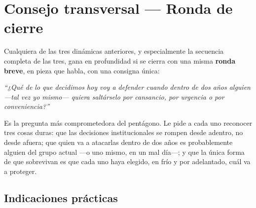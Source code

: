 \documentclass[11pt, a4paper]{article}
\begin{document}
\newpage

\section*{Consejo transversal --- Ronda de cierre}

Cualquiera de las tres dinámicas anteriores, y especialmente la secuencia completa de las tres, gana en profundidad si se cierra con una misma \textbf{ronda breve}, en pieza que habla, con una consigna única:

\vspace{0.5em}

\begin{center}
\begin{tcolorbox}[
  enhanced, colback=organizacionVerde, colframe=organizacionVerde,
  boxrule=0pt, arc=3pt,
  left=18pt, right=18pt, top=16pt, bottom=16pt,
  width=0.88\linewidth,
  halign=center
]
  {\color{parch}\itshape\large ``¿Qué de lo que decidimos hoy voy a defender cuando dentro de dos años alguien ---tal vez yo mismo--- quiera saltárselo por cansancio, por urgencia o por conveniencia?''}
\end{tcolorbox}
\end{center}

\vspace{0.5em}

Es la pregunta más comprometedora del pentágono. Le pide a cada uno reconocer tres cosas duras: que las decisiones institucionales se rompen desde adentro, no desde afuera; que quien va a atacarlas dentro de dos años es probablemente alguien del grupo actual ---o uno mismo, en un mal día---; y que la única forma de que sobrevivan es que cada uno haya elegido, en frío y por adelantado, cuál va a proteger.

\subsection*{Indicaciones prácticas}
\end{document}
